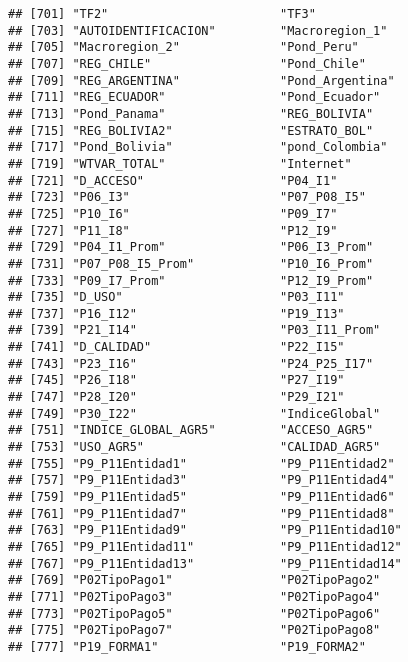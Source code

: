 \documentclass[
]{article}
\begin{document}
\begin{verbatim}
## [701] "TF2"                        "TF3"                       
## [703] "AUTOIDENTIFICACION"         "Macroregion_1"             
## [705] "Macroregion_2"              "Pond_Peru"                 
## [707] "REG_CHILE"                  "Pond_Chile"                
## [709] "REG_ARGENTINA"              "Pond_Argentina"            
## [711] "REG_ECUADOR"                "Pond_Ecuador"              
## [713] "Pond_Panama"                "REG_BOLIVIA"               
## [715] "REG_BOLIVIA2"               "ESTRATO_BOL"               
## [717] "Pond_Bolivia"               "pond_Colombia"             
## [719] "WTVAR_TOTAL"                "Internet"                  
## [721] "D_ACCESO"                   "P04_I1"                    
## [723] "P06_I3"                     "P07_P08_I5"                
## [725] "P10_I6"                     "P09_I7"                    
## [727] "P11_I8"                     "P12_I9"                    
## [729] "P04_I1_Prom"                "P06_I3_Prom"               
## [731] "P07_P08_I5_Prom"            "P10_I6_Prom"               
## [733] "P09_I7_Prom"                "P12_I9_Prom"               
## [735] "D_USO"                      "P03_I11"                   
## [737] "P16_I12"                    "P19_I13"                   
## [739] "P21_I14"                    "P03_I11_Prom"              
## [741] "D_CALIDAD"                  "P22_I15"                   
## [743] "P23_I16"                    "P24_P25_I17"               
## [745] "P26_I18"                    "P27_I19"                   
## [747] "P28_I20"                    "P29_I21"                   
## [749] "P30_I22"                    "IndiceGlobal"              
## [751] "INDICE_GLOBAL_AGR5"         "ACCESO_AGR5"               
## [753] "USO_AGR5"                   "CALIDAD_AGR5"              
## [755] "P9_P11Entidad1"             "P9_P11Entidad2"            
## [757] "P9_P11Entidad3"             "P9_P11Entidad4"            
## [759] "P9_P11Entidad5"             "P9_P11Entidad6"            
## [761] "P9_P11Entidad7"             "P9_P11Entidad8"            
## [763] "P9_P11Entidad9"             "P9_P11Entidad10"           
## [765] "P9_P11Entidad11"            "P9_P11Entidad12"           
## [767] "P9_P11Entidad13"            "P9_P11Entidad14"           
## [769] "P02TipoPago1"               "P02TipoPago2"              
## [771] "P02TipoPago3"               "P02TipoPago4"              
## [773] "P02TipoPago5"               "P02TipoPago6"              
## [775] "P02TipoPago7"               "P02TipoPago8"              
## [777] "P19_FORMA1"                 "P19_FORMA2"                

\end{verbatim}
\end{document}
